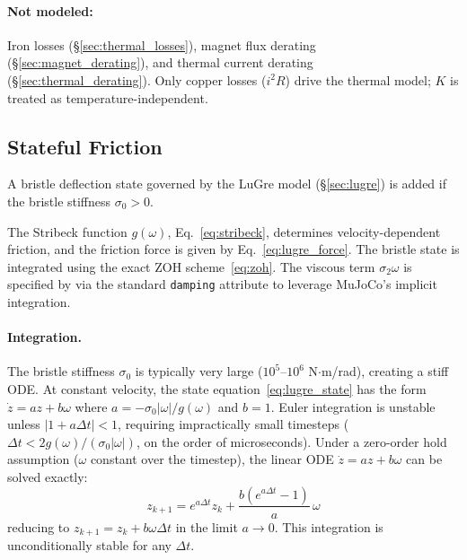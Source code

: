 \documentclass[10pt, a4paper, twocolumn]{article}
\let\oldtexttt\texttt
\renewcommand{\texttt}[1]{{\smaller\oldtexttt{#1}}}
\begin{document}
\paragraph{Not modeled:}
Iron losses (\S\ref{sec:thermal_losses}), magnet flux derating (\S\ref{sec:magnet_derating}), and thermal current derating (\S\ref{sec:thermal_derating}). Only copper losses ($i^2 R$) drive the thermal model; $K$ is treated as temperature-independent.

\subsection{Stateful Friction}
\label{sec:friction_impl}

A bristle deflection state governed by the LuGre model (\S\ref{sec:lugre}) is added if the bristle stiffness $\sigma_0 > 0$.

The Stribeck function $g(\omega)$, Eq.~\eqref{eq:stribeck}, determines velocity-dependent friction, and the friction force is given by Eq.~\eqref{eq:lugre_force}. The bristle state is integrated using the exact ZOH scheme~\eqref{eq:zoh}. The viscous term $\sigma_2 \omega$ is specified by via the standard \texttt{damping} attribute to leverage MuJoCo's implicit integration.
\paragraph{Integration.}
The bristle stiffness $\sigma_0$ is typically very large ($10^5$--$10^6$ N$\cdot$m/rad), creating a stiff ODE. At constant velocity, the state equation~\eqref{eq:lugre_state} has the form $\dot{z} = a z + b \omega$ where $a = -\sigma_0 |\omega| / g(\omega)$ and $b = 1$. Euler integration is unstable unless $|1 + a \Delta t| < 1$, requiring impractically small timesteps ($\Delta t < 2g(\omega)/(\sigma_0 |\omega|)$, on the order of microseconds).
Under a zero-order hold assumption ($\omega$ constant over the timestep), the linear ODE $\dot{z} = az + b\omega$ can be solved exactly:
\begin{equation}
  z_{k+1} = e^{a \Delta t} z_k
    + \frac{b(e^{a \Delta t} - 1)}{a} \, \omega
  \label{eq:zoh}
\end{equation}
reducing to $z_{k+1} = z_k + b\omega\Delta t$ in the limit $a \to 0$. This integration is unconditionally stable for any $\Delta t$.
\end{document}
